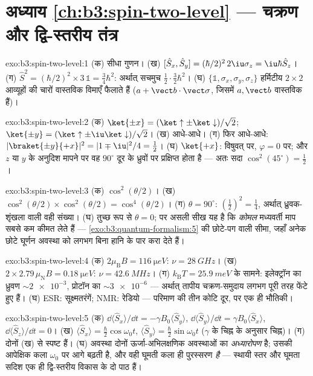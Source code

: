 \section*{अध्याय \ref{ch:b3:spin-two-level} --- चक्रण और द्वि-स्तरीय तंत्र}

\begin{solution}{exo:b3:spin-two-level:1}
(क) सीधा गुणन। (ख) $[\hat S_x, \hat S_y] =
(\hbar/2)^2\,2\iu\sigma_z = \iu\hbar\hat S_z$। (ग) $\hat S^2 =
(\hbar/2)^2 \times 3\,\mathbb 1 = \tfrac34\hbar^2$: अर्थात् सचमुच
$\tfrac12\cdot\tfrac32\hbar^2$। (घ) $\{\mathbb 1, \sigma_x,
\sigma_y, \sigma_z\}$ हर्मिटीय $2\times2$ आव्यूहों की चारों वास्तविक
विमाएँ फैलाते हैं ($a + \vect b\cdot\vect\sigma$, जिसमें $a,
\vect b$ वास्तविक हैं)।
\end{solution}

\begin{solution}{exo:b3:spin-two-level:2}
(क) $\ket{\pm x} = (\ket\uparrow \pm \ket\downarrow)/\sqrt2$;
$\ket{\pm y} = (\ket\uparrow \pm \iu\ket\downarrow)/\sqrt2$। (ख)
आधे-आधे। (ग) फिर आधे-आधे: $|\braket{\pm y}{+x}|^2 =
|1 \mp \iu|^2/4 = \tfrac12$। (घ) $\ket{+x}$: विषुवत् पर, $\varphi =
0$ पर; और $z$ या $y$ के अनुदिश मापने पर वह $90^\circ$ दूर के ध्रुवों
पर प्रक्षिप्त होता है --- अतः सदा $\cos^2(45^\circ) = \tfrac12$।
\end{solution}

\begin{solution}{exo:b3:spin-two-level:3}
(क) $\cos^2(\theta/2)$। (ख) $\cos^2(\theta/2) \times
\cos^2(\theta/2) = \cos^4(\theta/2)$। (ग) $\theta = 90^\circ$:
$(\tfrac12)^2 = \tfrac14$, अर्थात् ध्रुवक-शृंखला वाली वही संख्या। (घ)
तुच्छ रूप से $\theta = 0$; पर असली सीख यह है कि \emph{कोमल}
मध्यवर्ती माप सबसे कम कीमत लेते हैं ---
\cref{exo:b3:quantum-formalism:5} की छोटे-पग वाली सीमा, जहाँ अनेक
छोटे घूर्णन अवस्था को लगभग बिना हानि के पार करा देते हैं।
\end{solution}

\begin{solution}{exo:b3:spin-two-level:4}
(क) $2\mu_{\text{B}}B = \qty{116}{\micro eV}$: $\nu =
\qty{28}{GHz}$। (ख) $2 \times 2.79\,\mu_{\text{N}}B =
\qty{0.18}{\micro eV}$: $\nu = \qty{42.6}{MHz}$। (ग)
$k_{\text{B}}T = \qty{25.9}{meV}$ के सामने: इलेक्ट्रॉन का ध्रुवण
$\sim\num{2e-3}$, प्रोटॉन का $\sim\num{3e-6}$ --- अर्थात् तापीय
चक्रण-समुदाय लगभग पूरी तरह फेंटे हुए हैं। (घ) ESR: सूक्ष्मतरंगें;
NMR: रेडियो --- परिमाण की तीन कोटि दूर, पर एक ही भौतिकी।
\end{solution}

\begin{solution}{exo:b3:spin-two-level:5}
(क) $\dd\langle\hat S_x\rangle/\dd t = -\gamma B_0\langle\hat
S_y\rangle$, $\dd\langle\hat S_y\rangle/\dd t = \gamma
B_0\langle\hat S_x\rangle$, $\dd\langle\hat S_z\rangle/\dd t = 0$।
(ख) $\langle\hat S_x\rangle = \tfrac\hbar2\cos\omega_0t$,
$\langle\hat S_y\rangle = \tfrac\hbar2\sin\omega_0t$ ($\gamma$ के
चिह्न के अनुसार चिह्न)। (ग) दोनों (ख) से स्पष्ट हैं। (घ) अवस्था
दोनों ऊर्जा-अभिलक्षणिक अवस्थाओं का \emph{अध्यारोपण} है; उसकी आपेक्षिक
कला $\omega_0$ पर आगे बढ़ती है, और वही घूमती कला ही पुरस्सरण
\emph{है} --- स्थायी स्तर और घूमता सदिश एक ही द्वि-स्तरीय विकास के दो
पाठ हैं।
\end{solution}

